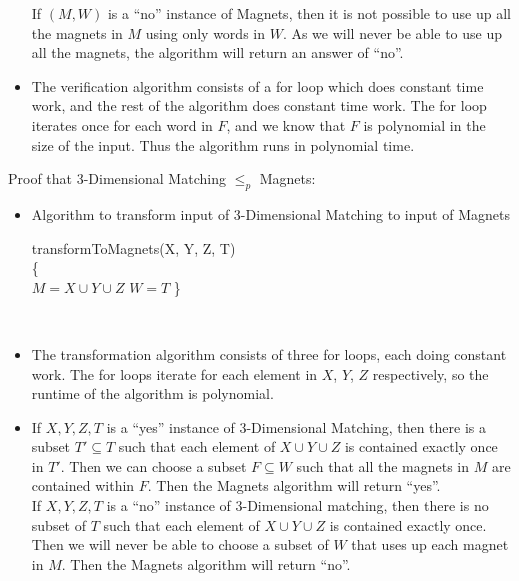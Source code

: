 \documentclass{assignment}
\begin{document}
\begin{problemlist}
\begin{answer}
\begin{itemize}
If $(M, W)$ is a ``no'' instance of Magnets, then it is not possible to use up all the magnets in $M$ using only words in $W$. As we will never be able to use up all the magnets, the algorithm will return an answer of ``no''.
\item The verification algorithm consists of a for loop which does constant time work, and the rest of the algorithm does constant time work. The for loop iterates once for each word in $F$, and we know that $F$ is polynomial in the size of the input. Thus the algorithm runs in polynomial time.
\end{itemize}
Proof that 3-Dimensional Matching $\le_p$ Magnets:
\begin{itemize}
\item Algorithm to transform input of 3-Dimensional Matching to input of Magnets
\IncMargin{3em}
\begin{algorithm}
  transformToMagnets(X, Y, Z, T)\\\{\\
  \Indp
  $M = X\cup Y\cup Z$\;
  $W = T$\;
  \;
  \Indm
  \}
\end{algorithm}
\DecMargin{3em}\\
\item The transformation algorithm consists of three for loops, each doing constant work. The for loops iterate for each element in $X$, $Y$, $Z$ respectively, so the runtime of the algorithm is polynomial.
\item If $X, Y, Z, T$ is a ``yes'' instance of 3-Dimensional Matching, then there is a subset $T'\subseteq T$ such that each element of $X\cup Y\cup Z$ is contained exactly once in $T'$. Then we can choose a subset $F\subseteq W$ such that all the magnets in $M$ are contained within $F$. Then the Magnets algorithm will return ``yes''.\\
If $X, Y, Z, T$ is a ``no'' instance of 3-Dimensional matching, then there is no subset of $T$ such that each element of $X\cup Y\cup Z$ is contained exactly once. Then we will never be able to choose a subset of $W$ that uses up each magnet in $M$. Then the Magnets algorithm will return ``no''.\\
\end{itemize}
\end{answer}

\end{problemlist}
\end{document}
